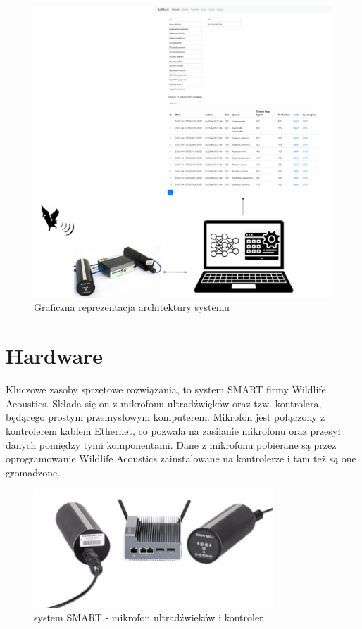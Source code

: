 \documentclass{sprz}
\begin{document}
\begin{figure}[h]
    \centering
    \includegraphics[width=1.0\textwidth]{sprz/graficzna-reprezentacja-systemu.png}
    \caption{Graficzna reprezentacja architektury systemu}
    \label{img:reprezentacja_graficzna}
\end{figure}

\section{Hardware}
Kluczowe zasoby sprzętowe rozwiązania, to system SMART firmy Wildlife Acoustics. Składa się on z mikrofonu ultradźwięków oraz tzw. kontrolera, będącego prostym przemysłowym komputerem. Mikrofon jest połączony z kontrolerem kablem Ethernet, co pozwala na zasilanie mikrofonu oraz przesył danych pomiędzy tymi komponentami. Dane z mikrofonu pobierane są przez oprogramowanie Wildlife Acoustics zainstalowane na kontrolerze i tam też są one gromadzone.
\clearpage

\begin{figure}[h]
  \centering
  \includegraphics[width=0.8\textwidth]{sprz/smart2}
  \caption{system SMART - mikrofon ultradźwięków i kontroler}
  \label{img:smart2}
\end{figure}
\end{document}
